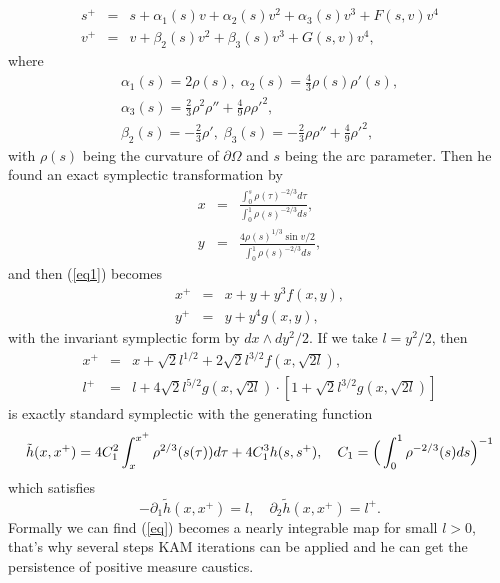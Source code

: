 \documentclass{amsart}
\begin{document}
\begin{eqnarray}\label{eq1}
s^+&=&s+\alpha_1(s)v+\alpha_2(s)v^2+\alpha_3(s)v^3+F(s,v)v^4\nonumber\\
v^+&=&v+\beta_2(s)v^2+\beta_3(s)v^3+G(s,v)v^4,
\end{eqnarray}
where
\begin{eqnarray}
\alpha_1(s)=2\rho(s),\;\alpha_2(s)=\frac{4}{3}\rho(s)\rho'(s),\nonumber\\
\alpha_3(s)=\frac{2}{3}\rho^2\rho''+\frac{4}{9}\rho\rho'^2,\nonumber\\
\beta_2(s)=-\frac{2}{3}\rho',\;\beta_3(s)=-\frac{2}{3}\rho\rho''+\frac{4}{9}\rho'^2,\nonumber
\end{eqnarray}
with $\rho(s)$ being the curvature of $\partial\Omega$ and $s$ being the arc parameter. Then he found an exact symplectic transformation by 
\begin{eqnarray}
x &=&\frac{\int_0^s\rho(\tau)^{-2/3}d\tau}{\int_0^1\rho(s)^{-2/3}ds},\nonumber\\
y &=&\frac{4\rho(s)^{1/3}\sin v/2}{\int_0^1\rho(s)^{-2/3}ds},
\end{eqnarray}
and then (\ref{eq1}) becomes
\begin{eqnarray}
x^+&=&x+y+y^3f(x,y),\nonumber\\
y^+&=&y+y^4g(x,y),
\end{eqnarray}
with the invariant symplectic form by $dx\wedge d{y^2}/{2}$. If we take $l=y^2/2$, then
\begin{eqnarray}\label{eq}
x^+&=&x+\sqrt{2}l^{1/2}+2\sqrt{2}l^{3/2}f(x,\sqrt{2l}),\\
l^+&=&l+4\sqrt{2}l^{5/2}g(x,\sqrt{2l})\cdot[1+\sqrt{2}l^{3/2}g(x,\sqrt{2l})]\nonumber
\end{eqnarray}
is exactly standard symplectic with the generating function 
\begin{equation}\label{generating}
\tilde{h}(x,x^+)=4C_1^2\int_x^{x^+}\rho^{2/3}(s(\tau))d\tau+4C_1^3h(s,s^+),\quad C_1=\Big{(}\int_0^1\rho^{-2/3}(s)ds\Big{)}^{-1}
\end{equation}
which satisfies 
\[
-\partial_1\tilde{h}(x,x^+)=l,\quad\partial_2\tilde{h}(x,x^+)=l^+.
\]
Formally we can find (\ref{eq}) becomes a nearly integrable map for small $l>0$, that's why several steps KAM iterations can be applied and he can get the persistence of positive measure caustics.\\
\end{document}
